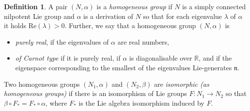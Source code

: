 \documentclass[a4paper,12pt]{amsart}
\newcommand{\pp}{\mathrm}
\newcommand{\e}{\mathrm{e}}
\newcommand{\I}{\mathrm{i}}
\newcounter{listoja_varten}
\newenvironment{lista}%
{	\begin{list}{(\roman{listoja_varten})}{\usecounter{listoja_varten}}	}%
	{	\end{list}				}
\theoremstyle{plain}
\theoremstyle{definition}
\newtheorem{maar}{Definition}[section]
\theoremstyle{plain}
\theoremstyle{remark}
\begin{document}
\begin{maar} \label{maar:homogeneous_group}
	A pair \( (N,\alpha) \) is a \emph{homogeneous group} if \( N \) is a simply connected nilpotent Lie group and \( \alpha \) is a derivation of \( N \) so that for each eigenvalue \( \lambda \)  of \( \alpha \) it holds \( \pp{Re}(\lambda) > 0 \).
	Further, we say that a homogeneous group \( (N,\alpha) \) is
	\begin{itemize}
		\item  \emph{purely real}, if the eigenvalues of \( \alpha \) are real numbers,
		\item \emph{of Carnot type} if it is purely real, if \( \alpha \) is diagonalisable over \( \mathbb{R} \), and if the eigenspace corresponding to the smallest of the eigenvalues Lie-generates \( \mathfrak{n} \).
	\end{itemize}
Two homogeneous groups \( (N_1,\alpha) \) and \( (N_2,\beta) \) are \emph{isomorphic (as homogeneous groups)} if there is an isomorphism of Lie groups \( F \colon N_1 \to N_2 \) so that \( \beta \circ F_* = F_* \circ \alpha \), where \( F_* \) is the Lie algebra isomorphism induced by \(F\).
\end{maar}
\end{document}
